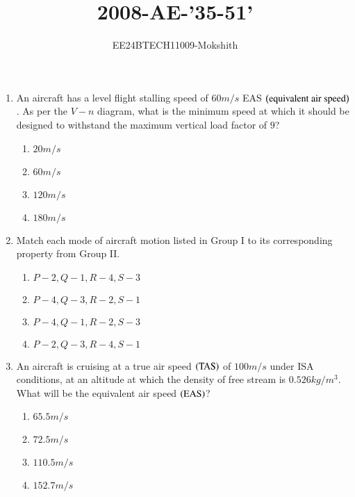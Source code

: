 \documentclass[journal]{IEEEtran}
\begin{document}

\title{2008-AE-'35-51'}
\author{EE24BTECH11009-Mokshith}
{\let\newpage\relax\maketitle}
\renewcommand{\thefigure}{\theenumi}
\renewcommand{\thetable}{\theenumi}
\setlength{\intextsep}{10pt} %
\renewcommand{\thetable}{\theenumi}

\begin{enumerate}[start=35]
\item An aircraft has a level flight stalling speed of $60  m/s$ EAS $\left(\text{equivalent air speed}\right)$. As per the $V-n$ diagram, what is the minimum speed at which it should be designed to withstand the maximum vertical load factor of $9$?
\begin{enumerate}
    \item $20 m/s$
    \item $60 m/s$
    \item $120 m/s$
    \item $180 m/s$
\end{enumerate}
\item Match each mode of aircraft motion listed in Group I to its corresponding property from Group II.
\begin{table}[h]
    \centering
    
    \caption{}
\label{tab:my_label}
\end{table}
\begin{enumerate}
    \item $P-2, Q-1, R-4, S-3$
    \item $P-4, Q-3, R-2, S-1$
    \item $P-4, Q-1, R-2, S-3$
    \item $P-2, Q-3, R-4, S-1$
\end{enumerate}
\item An aircraft is cruising at a true air speed $\left(\text{TAS}\right)$ of $100 m/s$ under ISA conditions, at an altitude at which the density of free stream is $0.526  kg/m^3$. What will be the equivalent air speed $\left(\text{EAS}\right)$?
\begin{enumerate}
    \item $65.5 m/s$
    \item $72.5 m/s$
    \item $110.5 m/s$
    \item $152.7 m/s$
\end{enumerate}

\end{enumerate}
\end{document}

